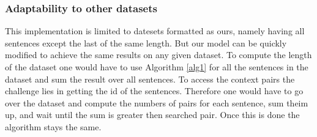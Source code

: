 \subsubsection{Adaptability to other datasets}
This implementation is limited to datesets formatted as ours, namely having all sentences except the last of the same length. But our model can be quickly modified to achieve the same results on any given dataset. To compute the length of the dataset one would have to use Algorithm \ref{alg1} for all the sentences in the dataset and sum the result over all sentences. To access the context pairs the challenge lies in getting the id of the sentences. Therefore one would have to go over the dataset and compute the numbers of pairs for each sentence, sum theim up, and wait until the sum is greater then searched pair. Once this is done the algorithm stays the same. 

